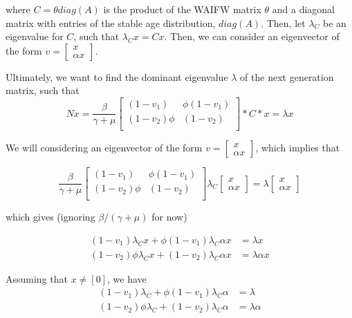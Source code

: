\documentclass[12pt]{article}
\begin{document}
\noindent
where $C = \theta diag(A)$ is the product of the WAIFW matrix $\theta$ and a diagonal matrix with entries of the stable age distribution, $diag(A)$. Then, let $\lambda_C$ be an eigenvalue for $C$, such that $\lambda_Cx = Cx$. Then, we can consider an eigenvector of the form $v = \begin{bmatrix}
    x \\
    \alpha x \end{bmatrix}$. 

\noindent
Ultimately, we want to find the dominant eigenvalue $\lambda$ of the next generation matrix, such that 
\[
    N x = \frac{\beta}{\gamma + \mu} 
     \begin{bmatrix}
     (1-v_1) & \phi (1-v_1) \\
     (1-v_2)\phi & (1-v_2)  \\
    \end{bmatrix} * C * x = \lambda x
\] 

\noindent
We will considering an eigenvector of the form $v = \begin{bmatrix}
    x \\
    \alpha x
\end{bmatrix}$, which implies that  


\[
    \frac{\beta}{\gamma + \mu} 
     \begin{bmatrix}
     (1-v_1) & \phi (1-v_1) \\
     (1-v_2)\phi & (1-v_2)  \\
    \end{bmatrix} \lambda_C \begin{bmatrix}
    x \\
    \alpha x
\end{bmatrix}  = \lambda \begin{bmatrix}
    x \\
    \alpha x
\end{bmatrix}
\]

\noindent
which gives (ignoring $\beta /(\gamma + \mu)$ for now)

\begin{align}
    (1-v_1) \lambda_C x + \phi (1-v_1) \lambda_C \alpha x &= \lambda x \\
    (1-v_2)\phi \lambda_C x + (1-v_2) \lambda_C \alpha x &= \lambda \alpha x
\end{align}

\noindent
Assuming that $x \neq [0]$, we have 
\begin{align}
    (1-v_1) \lambda_C + \phi (1-v_1) \lambda_C \alpha &= \lambda \\
    (1-v_2)\phi \lambda_C + (1-v_2) \lambda_C \alpha &= \lambda \alpha
\end{align}
\end{document}
